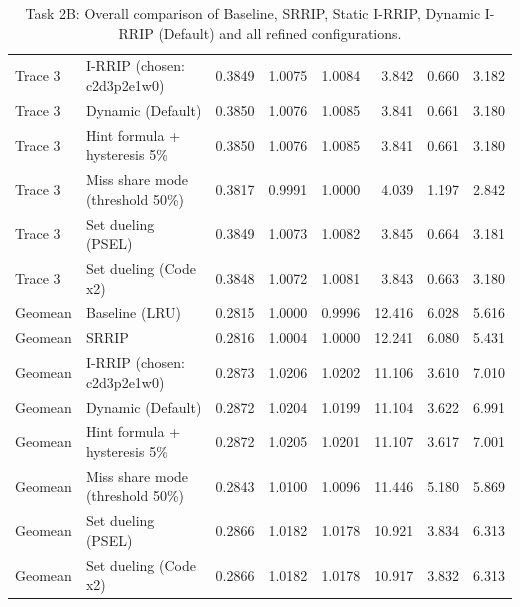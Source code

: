 \begin{table}[H]
{\begin{tabular}{llrrrrrr}
Trace 3 & I-RRIP (chosen: c2d3p2e1w0) & 0.3849 & 1.0075 & 1.0084 & 3.842 & 0.660 & 3.182 \\
Trace 3 & Dynamic (Default) & 0.3850 & 1.0076 & 1.0085 & 3.841 & 0.661 & 3.180 \\
Trace 3 & Hint formula + hysteresis 5\% & 0.3850 & 1.0076 & 1.0085 & 3.841 & 0.661 & 3.180 \\
Trace 3 & Miss share mode (threshold 50\%) & 0.3817 & 0.9991 & 1.0000 & 4.039 & 1.197 & 2.842 \\
Trace 3 & Set dueling (PSEL) & 0.3849 & 1.0073 & 1.0082 & 3.845 & 0.664 & 3.181 \\
Trace 3 & Set dueling (Code x2) & 0.3848 & 1.0072 & 1.0081 & 3.843 & 0.663 & 3.180 \\
\midrule
Geomean & Baseline (LRU) & 0.2815 & 1.0000 & 0.9996 & 12.416 & 6.028 & 5.616 \\
Geomean & SRRIP & 0.2816 & 1.0004 & 1.0000 & 12.241 & 6.080 & 5.431 \\
Geomean & I-RRIP (chosen: c2d3p2e1w0) & 0.2873 & 1.0206 & 1.0202 & 11.106 & 3.610 & 7.010 \\
Geomean & Dynamic (Default) & 0.2872 & 1.0204 & 1.0199 & 11.104 & 3.622 & 6.991 \\
Geomean & Hint formula + hysteresis 5\% & 0.2872 & 1.0205 & 1.0201 & 11.107 & 3.617 & 7.001 \\
Geomean & Miss share mode (threshold 50\%) & 0.2843 & 1.0100 & 1.0096 & 11.446 & 5.180 & 5.869 \\
Geomean & Set dueling (PSEL) & 0.2866 & 1.0182 & 1.0178 & 10.921 & 3.834 & 6.313 \\
Geomean & Set dueling (Code x2) & 0.2866 & 1.0182 & 1.0178 & 10.917 & 3.832 & 6.313 \\
\bottomrule
\end{tabular}}
\ifdim\wd\fitbx>\linewidth\resizebox{\linewidth}{!}{\usebox{\fitbx}}\else\usebox{\fitbx}\fi
\caption{Task 2B: Overall comparison of Baseline, SRRIP, Static I-RRIP, Dynamic I-RRIP (Default) and all refined configurations.}\label{tab:t2b_overall}
\end{table}
